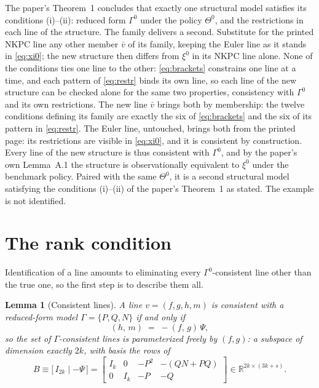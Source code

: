 \documentclass[11pt]{article}
\newtheorem{lemma}{Lemma}
\theoremstyle{remark}
\newcommand{\R}{\mathbb{R}}
\begin{document}
The paper's Theorem~1 concludes that exactly one structural model satisfies its conditions (i)--(ii): reduced form $\Gamma^0$ under the policy $\Theta^0$, and the restrictions in each line of the structure. The family delivers a second. Substitute for the printed NKPC line any other member $\bar v$ of its family, keeping the Euler line as it stands in \eqref{eq:xi0}; the new structure then differs from $\xi^0$ in its NKPC line alone. None of the conditions ties one line to the other: \eqref{eq:brackets} constrains one line at a time, and each pattern of \eqref{eq:restr} binds its own line, so each line of the new structure can be checked alone for the same two properties, consistency with $\Gamma^0$ and its own restrictions. The new line $\bar v$ brings both by membership: the twelve conditions defining its family are exactly the six of \eqref{eq:brackets} and the six of its pattern in \eqref{eq:restr}. The Euler line, untouched, brings both from the printed page: its restrictions are visible in \eqref{eq:xi0}, and it is consistent by construction. Every line of the new structure is thus consistent with $\Gamma^0$, and by the paper's own Lemma~A.1 the structure is observationally equivalent to $\xi^0$ under the benchmark policy. Paired with the same $\Theta^0$, it is a second structural model satisfying the conditions (i)--(ii) of the paper's Theorem~1 as stated. The example is not identified.

\section{The rank condition}\label{sec:rank}

Identification of a line amounts to eliminating every $\Gamma^0$-consistent line other than the true one, so the first step is to describe them all.

\begin{lemma}[Consistent lines]\label{lem:null}
A line $v=(f,g,h,m)$ is consistent with a reduced-form model $\Gamma=\{P,Q,N\}$ if and only if
\begin{equation}\label{eq:pinning}
(h,\,m)\;=\;-(f,\,g)\,\Psi ,
\end{equation}
so the set of $\Gamma$-consistent lines is parameterized freely by $(f,g)$: a subspace of dimension exactly $2k$, with basis the rows of
\begin{equation*}
B\equiv\bigl[\,I_{2k} \mid -\Psi\,\bigr] =\begin{bmatrix} I_k & 0 & -P^2 & -(QN+PQ)\\
0 & I_k & -P & -Q
\end{bmatrix}
\in\R^{2k\times(3k+s)} .
\end{equation*}
\end{lemma}
\end{document}
